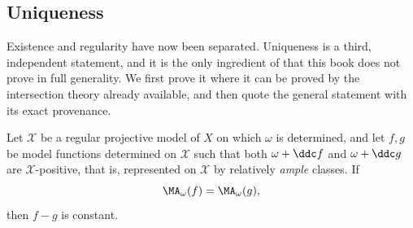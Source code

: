 \subsection{Uniqueness}
\label{sec:ch29-uniqueness}

Existence and regularity have now been separated.  Uniqueness is a third,
independent statement, and it is the only ingredient of
 that this book does not prove in
full generality.  We first prove it where it can be proved by the
intersection theory already available, and then quote the general statement
with its exact provenance.

\begin{proposition}
\label{prop:ch29-model-uniqueness}
Let \(\mathcal X\) be a regular projective model of \(X\) on which
\(\omega\) is determined, and let \(f,g\) be model functions determined on
\(\mathcal X\) such that both \(\omega+\ddc f\) and \(\omega+\ddc g\) are
\(\mathcal X\)-positive, that is, represented on \(\mathcal X\) by
relatively \emph{ample} classes.  If
\[
 \MA_\omega(f)=\MA_\omega(g),
\]
then \(f-g\) is constant.
\end{proposition}

